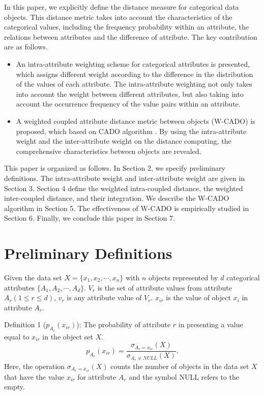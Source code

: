 \documentclass[review]{elsarticle}
\begin{document}
In this paper, we explicitly define the distance measure for categorical data objects. This distance metric takes into account the characteristics of the categorical values, including the frequency probability within an attribute, the relations between attributes and the difference of attribute. The key contribution are as follows.
\begin{itemize}
  \item An intra-attribute weighting scheme for categorical attributes is presented, which assigns different weight according to the difference in the distribution of the values of each attribute. The intra-attribute weighting not only takes into account the weight between different attributes, but also taking into account the occurrence frequency of the value pairs within an attribute.

  \item A weighted coupled attribute distance metric between objects (W-CADO) is proposed, which based on CADO algorithm \cite{WangC2015CADO}. By using the intra-attribute weight and the inter-attribute weight \cite{JiaH2016NewMetric} on the distance computing, the comprehensive characteristics between objects are revealed.
\end{itemize}

This paper is organized as follows. In Section 2, we specify preliminary definitions. The intra-attribute weight and inter-attribute weight are given in Section 3. Section 4 define the weighted intra-coupled distance, the weighted inter-coupled distance, and their integration. We describe the W-CADO algorithm in Section 5. The effectiveness of W-CADO is empirically studied in Section 6. Finally, we conclude this paper in Section 7.

\section{Preliminary Definitions}
Given the data set ${X} = \{x_1,x_2,\cdots,x_n\}$ with $n$ objects represented by $d$ categorical attributes $\{A_1,A_2,\cdots,A_d\}$. $V_r$ is the set of attribute values from attribute $A_r (1 \leq r \leq d)$, $v_r$ is any attribute value of $V_r$. $x_{ir}$ is the value of object $x_i$ in attribute $A_r$.

Definition 1 \cite{TiagoC2015SimilarityMeasure} ($p_{A_r}(x_{ir})$): The probability of attribute $r$ in presenting a value equal to $x_{ir}$ in the object set $X$.
\begin{equation}
p_{A_r}(x_{ir}) = \frac{\sigma_{A_r = x_{ir}}(X)}{\sigma_{A_r \neq NULL}(X)}.
\label{equ1}
\end{equation}
Here, the operation $\sigma_{A_r = x_{ir}}(X)$ counts the number of objects in the data set $X$ that have the value $x_{ir}$ for attribute $A_{r}$ and the symbol NULL refers to the empty.
\end{document}
